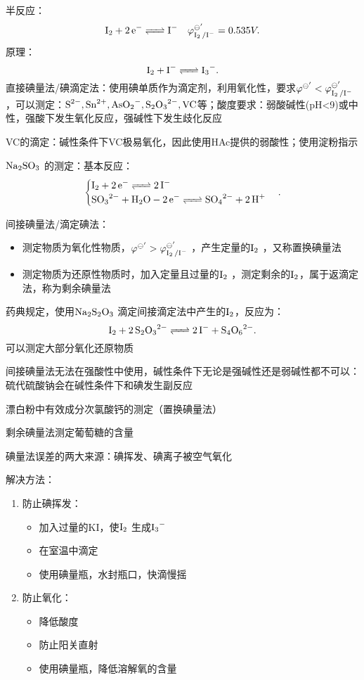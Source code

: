 半反应：\[
    \ce{I_2 +2e-} \ce{<=>[][]} \ce{I-} \quad \varphi_{\ce{I_2 /I-}}^{\ominus'} =0.535V
.\]
原理：\[
    \ce{I_2 +I-}\ce{<=>[][]}\ce{I_3-}
.\]
直接碘量法/碘滴定法：使用碘单质作为滴定剂，利用氧化性，要求$\varphi^{\ominus'} <\varphi_{\ce{I_2 /I-}}^{\ominus'} $ ，可以测定：$\ce{S^2-, Sn^2+, AsO_2^-, S_2O_3^2-, VC}$等；酸度要求：弱酸碱性(pH<9)或中性，强酸下发生氧化反应，强碱性下发生歧化反应
\begin{eg}
VC的滴定：碱性条件下VC极易氧化，因此使用HAc提供的弱酸性；使用淀粉指示

$\ce{Na_2SO_3}$ 的测定：基本反应：\[
    \begin{cases}
        \ce{I_2 +2e-}\ce{<=>[][]}\ce{2I-}\\
        \ce{SO_3^2- +H_2O - 2e-}\ce{<=>[][]}\ce{SO_4^2- +2H+}
    \end{cases}
.\]
\end{eg}
间接碘量法/滴定碘法：
\begin{itemize}
    \item 测定物质为氧化性物质，$\varphi^{\ominus'} >\varphi_{\ce{I_2 /I-}}^{\ominus'} $ ，产生定量的$\ce{I_2}$ ，又称置换碘量法
    \item 测定物质为还原性物质时，加入定量且过量的$\ce{I_2}$ ，测定剩余的$\ce{I_2}$，属于返滴定法，称为剩余碘量法
\end{itemize}
\begin{notation}
药典规定，使用$\ce{Na_2S_2O_3}$ 滴定间接滴定法中产生的$\ce{I_2}$，反应为：\[
    \ce{I_2 +2S_2O_3^2-} \ce{<=>[][]}\ce{2I- +S_4O_6^2-}
.\]
可以测定大部分氧化还原物质
\end{notation}
\begin{notation}
    间接碘量法无法在强酸性中使用，碱性条件下无论是强碱性还是弱碱性都不可以：硫代硫酸钠会在碱性条件下和碘发生副反应
\end{notation}
\begin{eg}
    漂白粉中有效成分次氯酸钙的测定（置换碘量法）

    剩余碘量法测定葡萄糖的含量
\end{eg}
\begin{notation}
碘量法误差的两大来源：碘挥发、碘离子被空气氧化

解决方法：
\begin{enumerate}
    \item 防止碘挥发：
        \begin{itemize}
            \item 加入过量的KI，使$\ce{I_2}$ 生成$\ce{I_3-}$ 
            \item 在室温中滴定
            \item 使用碘量瓶，水封瓶口，快滴慢摇
        \end{itemize}
    \item 防止氧化：
        \begin{itemize}
            \item 降低酸度
            \item 防止阳关直射
            \item 使用碘量瓶，降低溶解氧的含量
        \end{itemize}
\end{enumerate}
\end{notation}
